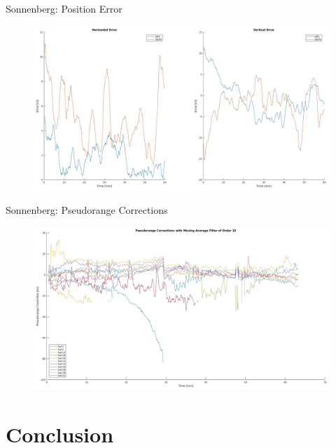 \documentclass[12pt, compress, xcolor=table]{beamer}
\begin{document}
\begin{frame}{Sonnenberg: Position Error}
 \begin{figure}
  \centering
  \includegraphics[width=\textwidth]{images/Errors_Sonnenberg.png}
 \end{figure}
\end{frame}

\begin{frame}{Sonnenberg: Pseudorange Corrections}
 \begin{figure}
  \centering
  \includegraphics[width=\textwidth]{images/PRCs_Sonnenberg.png}
 \end{figure}
\end{frame}


\section{Conclusion}
\end{document}

